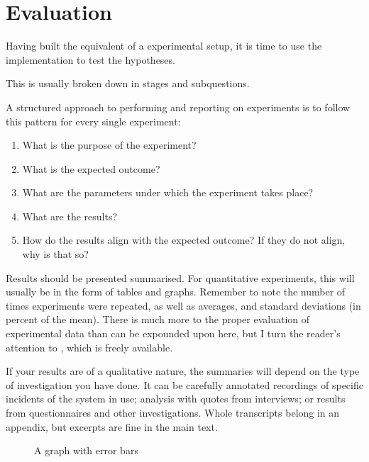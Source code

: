 \chapter{Evaluation}
\label{cha:evaluation}

Having built the equivalent of a experimental setup, it is time to use
the implementation to test the hypotheses.

This is usually broken down in stages and subquestions.

A structured approach to performing and reporting on experiments is
to follow this pattern for every single experiment:

\begin{enumerate}
\item What is the purpose of the experiment?
\item What is the expected outcome?
\item What are the parameters under which the experiment takes place?
\item What are the results?
\item How do the results align with the expected outcome? If they do not
  align, why is that so?
\end{enumerate}

Results should be presented summarised. For quantitative experiments, this
will usually be in the form of tables and graphs.  Remember to note the
number of times experiments were repeated, as well as averages, and standard
deviations (in percent of the mean).  There is much more to the proper
evaluation of experimental data than can be expounded upon here, but I turn
the reader's attention to \citep{Downey2011:TSPASFP2011}, which is freely
available.

If your results are of a qualitative nature, the summaries will depend on
the type of investigation you have done. It can be carefully annotated
recordings of specific incidents of the system in use; analysis with quotes
from interviews; or results from questionnaires and other investigations.
Whole transcripts belong in an appendix, but excerpts are fine in the main
text.



\begin{figure}
  \myfloatalign
  \caption{A graph with error bars}
  \label{fig:pretty-graph}
\end{figure}



